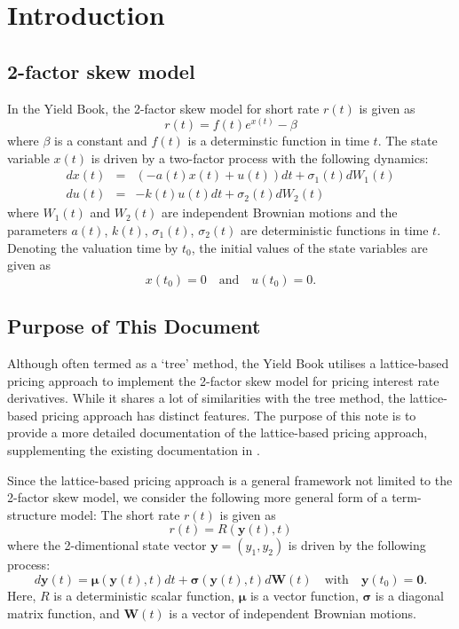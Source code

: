 \documentclass{texyise}
\begin{document}
\section{Introduction}

\subsection{2-factor skew model}

In the Yield Book, the 2-factor skew model for short rate $r(t)$ is given as
\begin{equation}
    r(t) = f(t) e^{x(t)} - \beta  \label{E:2fskew}
\end{equation}
where $\beta$ is a constant and $f(t)$ is a determinstic function in time $t$. The state variable $x(t)$ is driven by a two-factor process with the following dynamics:
\begin{eqnarray}
    dx(t) &=& (-a(t)x(t)+u(t))dt + \sigma_1(t) dW_1(t) \label{E:2fskew1} \\
    du(t) &=& -k(t)u(t)dt + \sigma_2(t) dW_2(t) \label{E:2fskew2}
\end{eqnarray}
where $W_1(t)$ and $W_2(t)$ are independent Brownian motions and the parameters $a(t)$, $k(t)$, $\sigma_1(t)$, $\sigma_2(t)$ are deterministic functions in time $t$.
Denoting the valuation time by $t_0$, the initial values of the state variables are given as
\begin{equation}
    x(t_0) = 0 \quad \text{and} \quad u(t_0) = 0.
\end{equation}

\subsection{Purpose of This Document}

Although often termed as a `tree' method, the Yield Book utilises a lattice-based pricing approach to implement the 2-factor skew model for pricing interest rate derivatives. While it shares a lot of similarities with the tree method, the lattice-based pricing approach has distinct features. The purpose of this note is to provide a more detailed documentation of the lattice-based pricing approach, supplementing the existing documentation in \cite{2fs-citi-mv}.

Since the lattice-based pricing approach is a general framework not limited to the 2-factor skew model, we consider the following more general form of a term-structure model: The short rate $r(t)$ is given as
\begin{equation}
    r(t) = R(\bm{y}(t), t) \label{E:short-rate-generic}
\end{equation}
where the 2-dimentional state vector $\bm{y} = (y_1, y_2)$ is driven by the following process:
\begin{equation}
    d\bm{y}(t) = \bm{\mu}(\bm{y}(t), t) dt + \bm{\sigma}(\bm{y}(t), t) d\bm{W}(t) 
    \quad\text{with}\quad \bm{y}(t_0) = \bm{0}.
    \label{E:state-variable-generic}
\end{equation}
Here, $R$ is a deterministic scalar function, $\bm{\mu}$ is a vector function, $\bm{\sigma}$ is a diagonal matrix function, and $\bm{W}(t)$ is a vector of independent Brownian motions.
\end{document}
